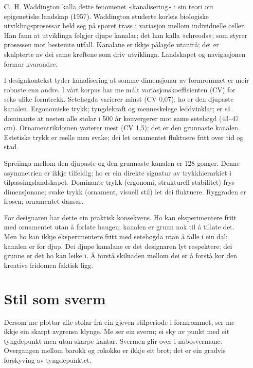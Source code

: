 C.~H. Waddington kalla dette fenomenet «kanalisering» i sin teori om epigenetiske landskap (1957). Waddington studerte korleis biologiske utviklingsprosessar held seg på sporet trass i variasjon mellom individuelle celler. Han fann at utviklinga følgjer djupe kanalar; det han kalla «chreods»; som styrer prosessen mot bestemte utfall. Kanalane er ikkje pålagde utanfrå; dei er skulpterte av dei same kreftene som driv utviklinga. Landskapet og navigasjonen formar kvarandre.

I designkontekst tyder kanalisering at somme dimensjonar av formrommet er meir robuste enn andre. I vårt korpus har me målt variasjonskoeffisienten (CV) for seks ulike formtrekk. Setehøgda varierer minst (CV  0,07); ho er den djupaste kanalen. Ergonomiske trykk; tyngdekraft og menneskelege leddvinklar; er så dominante at nesten alle stolar i 500 år konvergerer mot same setehøgd (43--47 cm). Ornamentrikdomen varierer mest (CV  1,5); det er den grunnaste kanalen. Estetiske trykk er reelle men svake; dei let ornamentet fluktuere fritt over tid og stad.

Spreiinga mellom den djupaste og den grunnaste kanalen er 128 gonger. Denne asymmetrien er ikkje tilfeldig; ho er ein direkte signatur av trykkhierarkiet i tilpassingslandskapet. Dominante trykk (ergonomi, strukturell stabilitet) frys dimensjonane; svake trykk (ornament, visuell stil) let dei fluktuere. Ryggraden er frosen; ornamentet dansar.

For designaren har dette ein praktisk konsekvens. Ho kan eksperimentere fritt med ornamentet utan å forlate haugen; kanalen er grunn nok til å tillate det. Men ho kan ikkje eksperimentere fritt med setehøgda utan å falle i ein dal; kanalen er for djup. Dei djupe kanalane er det designaren lyt respektere; dei grunne er det ho kan leike i. Å forstå skilnaden mellom dei er å forstå kor den kreative fridomen faktisk ligg.

\section*{Stil som sverm}


Dersom me plottar alle stolar frå ein gjeven stilperiode i formrommet, ser me ikkje ein skarpt avgrensa klynge. Me ser ein sverm; ei sky av punkt med eit tyngdepunkt men utan skarpe kantar. Svermen glir over i nabosvermane. Overgangen mellom barokk og rokokko er ikkje eit brot; det er ein gradvis forskyving av tyngdepunktet.

